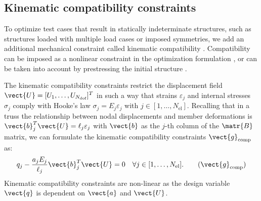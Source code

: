 \subsection{Kinematic compatibility constraints}
To optimize test cases that result in statically indeterminate structures, such as structures loaded with multiple load cases or imposed symmetries, we add an additional mechanical constraint called kinematic compatibility . Compatibility can be imposed as a nonlinear constraint in the optimization formulation , or can be taken into account by prestressing the initial structure .

The kinematic compatibility constraints restrict the displacement field $\vect{U} = [U_1, \ldots,U_{N_{\text{dof}}}]^T$ in such a way that strains $\varepsilon_j$ and internal stresses $\sigma_j$ comply with Hooke's law $\sigma_j = E_j \varepsilon_j$ with $j \in [1,\ldots, N_{\text{el}}]$. Recalling that in a truss the relationship between nodal displacements and member deformations is $\vect{b}^T_j \vect{U} = \ell_j \varepsilon_j$ with $\vect{b}$ as the $j$-th column of the $\matr{B}$ matrix, we can formulate the kinematic compatibility constraints $\vect{g}_{\textrm{comp}}$ as:
\begin{equation}
\label{eq:04_compatib}
     q_j - \frac{a_j E_j}{\ell_j} \vect{b}_j^T\vect{U}  = 0  \quad \forall j \in [1,\ldots, N_{\text{el}}].
     \tag{$\vect{g}_{\textrm{comp}}$}
\end{equation}
Kinematic compatibility constraints are non-linear as the design variable $\vect{q}$ is dependent on $\vect{a}$ and $\vect{U}$.


